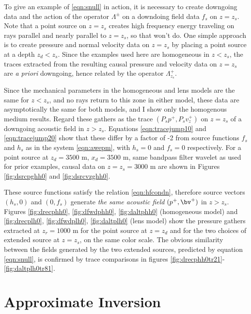 To give an example of \ref{eqn:snull} in action, it is necessary to
create downgoing data and the action of the operator $\Lambda^{\pm}$
on a downdoing field data $f_s$ on $z=z_s$. Note that a point source
on $z=z_s$ creates high frequency energy traveling on rays parallel
and nearly parallel to $z=z_s$, so that won't do. One simple approach
is to create pressure and normal velocity data on $z=z_s$ by placing a
point source at a depth $z_d<z_s$. Since the examples used here are
homogeneous in $z<z_s$, the traces extracted from the resulting
causal pressure and velocity data on $z=z_s$ are {\em a priori}
downgoing, hence related by the operator $\Lambda^+_{z_s}$.

Since the
mechanical parameters in the homogeneous and lens models are the same
for $z<z_s$, and no rays return to this zone in either model, these
data are asymptotically the same for both models, and I show only the
homogenous medium results. Regard these gathers as the trace
$(P_sp^+,P_sv^+_z)$ on $z=z_s$ of a downgoing acoustic field in $z>z_s$.
Equations \ref{eqn:tracejump10} and
\ref{eqn:tracejump20} show that these differ by a factor of -2 from
source functions $f_s$ and $h_s$ as in the system \ref{eqn:awepm},
with $h_s=0$ and $f_s=0$ respectively. For a point source at $z_d=3500$ m, $x_d=3500$ m, same bandpass filter
wavelet as used for prior examples, causal data on $z=z_s=3000$ m are
shown in Figures \ref{fig:dsrcpghh0} and \ref{fig:dsrcvzghh0}. 

These source functions satisfy
the relation \ref{eqn:hfcondn}, therefore source vectors $(h_s,0)$ and
$(0, f_s)$ generate {\em the same acoustic field} $(p^+,\bv^+)$ in $z>z_s$. Figures
\ref{fig:drecphh0}, \ref{fig:dfwdphh0}, \ref{fig:daltphh0} (homogeneous model) and
\ref{fig:drecplh0}, \ref{fig:dfwdplh0}, \ref{fig:daltplh0} (lens model) show the pressure
gathers extracted at $z_r=1000$ m for the point source at $z=z_d$ and
for the two choices of extended source at $z=z_s$, on the same color
scale. The obvious similarity between the fields generated by the two
extended sources,
predicted by equation \ref{eqn:snull}, is confirmed by trace
comparisons in figures \ref{fig:drecphh0tr21}-\ref{fig:daltplh0tr81}.


\section{Approximate Inversion}

